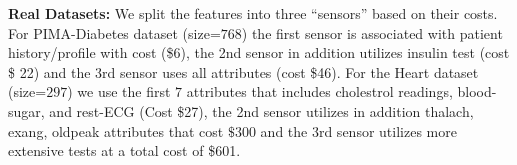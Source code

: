 
{\bf Real Datasets:} %
We split the features into three ``sensors'' based on their costs. For PIMA-Diabetes dataset (size=$768$) the first sensor is associated with patient history/profile with cost (\$6), the 2nd sensor in addition utilizes  insulin test (cost \$ 22) and the 3rd sensor uses all attributes (cost \$46). For the Heart dataset (size=$297$) we use the first $7$ attributes that includes cholestrol readings, blood-sugar, and rest-ECG (Cost \$27), the 2nd sensor utilizes in addition thalach, exang, oldpeak attributes that cost $\$300$  and the 3rd sensor utilizes more extensive tests at a total cost of \$601. 


